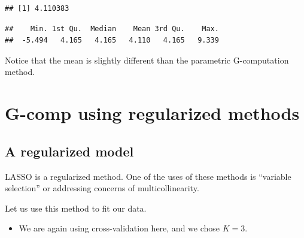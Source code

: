 \documentclass[
]{book}
\newenvironment{Shaded}{\begin{snugshade}}{\end{snugshade}}
\newcommand{\FunctionTok}[1]{\textcolor[rgb]{0.00,0.00,0.00}{#1}}
\newcommand{\NormalTok}[1]{#1}
\newcommand{\OtherTok}[1]{\textcolor[rgb]{0.56,0.35,0.01}{#1}}
\newcommand{\SpecialCharTok}[1]{\textcolor[rgb]{0.00,0.00,0.00}{#1}}
\providecommand{\tightlist}{%
  \setlength{\itemsep}{0pt}\setlength{\parskip}{0pt}}
\begin{document}
\begin{Shaded}
\end{Shaded}

\begin{verbatim}
## [1] 4.110383
\end{verbatim}

\begin{Shaded}
\end{Shaded}

\begin{verbatim}
##    Min. 1st Qu.  Median    Mean 3rd Qu.    Max. 
##  -5.494   4.165   4.165   4.110   4.165   9.339
\end{verbatim}

Notice that the mean is slightly different than the parametric G-computation method.

\hypertarget{g-comp-using-regularized-methods}{%
\section{G-comp using regularized methods}\label{g-comp-using-regularized-methods}}

\hypertarget{a-regularized-model}{%
\subsection{A regularized model}\label{a-regularized-model}}

\begin{rmdcomment}
LASSO is a regularized method. One of the uses of these methods is
``variable selection'' or addressing concerns of multicollinearity.
\end{rmdcomment}

Let us use this method to fit our data.

\begin{itemize}
\tightlist
\item
  We are again using cross-validation here, and we chose \(K=3\).
\end{itemize}
\end{document}
